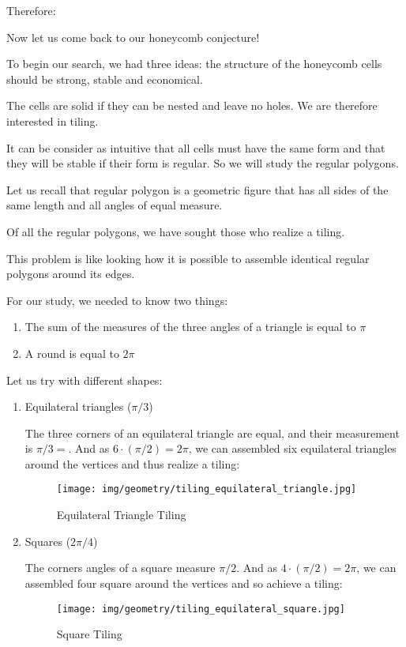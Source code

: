 {	Therefore:
	
	
	Now let us come back to our honeycomb conjecture!
	
	To begin our search, we had three ideas: the structure of the honeycomb cells should be strong, stable and economical.
	
	The cells are solid if they can be nested and leave no holes. We are therefore interested in tiling.
	
	It can be consider as intuitive that all cells must have the same form and that they will be stable if their form is regular. So we will study the regular polygons.
	
	Let us recall that regular polygon is a geometric figure that has all sides of the same length and all angles of equal measure.
	
	Of all the regular polygons, we have sought those who realize a tiling.
	
	This problem is like looking how it is possible to assemble identical regular polygons around its edges.
	
	For our study, we needed to know two things:
	\begin{enumerate}
		\item The sum of the measures of the three angles of a triangle is equal to $\pi$

		\item A round is equal to $2\pi$
	\end{enumerate}
	Let us try with different shapes:
	\begin{enumerate}
		\item Equilateral triangles ($\pi/3$)

		The three corners of an equilateral triangle are equal, and their measurement is $\pi/3=$. And as $6\cdot (\pi/2) = 2\pi$, we can assembled six equilateral triangles around the vertices and thus realize a tiling:
		\begin{figure}[H]
			\centering
			\texttt{[image: img/geometry/tiling\_equilateral\_triangle.jpg]}
			\caption[]{Equilateral Triangle Tiling}
		\end{figure}
		
		\item Squares ($2\pi/4$)

		The corners angles of a square measure $\pi/2$. And as $4\cdot (\pi/2)=2\pi$, we can assembled four square around the vertices and so achieve a tiling:
		\begin{figure}[H]
			\centering
			\texttt{[image: img/geometry/tiling\_equilateral\_square.jpg]}
			\caption[]{Square Tiling}
		\end{figure}
		

\end{enumerate}}
